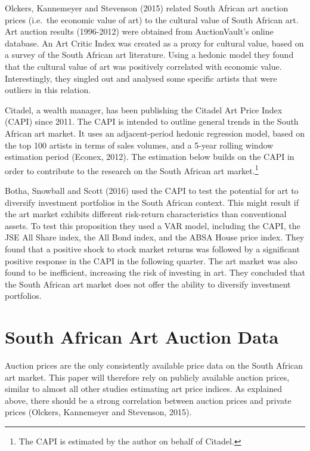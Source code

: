 \documentclass[12pt,]{article}
\let\rmarkdownfootnote\footnote%
\def\footnote{\protect\rmarkdownfootnote}
\begin{document}
Olckers, Kannemeyer and Stevenson (2015) related South African art
auction prices (i.e.~the economic value of art) to the cultural value of
South African art. Art auction results (1996-2012) were obtained from
AuctionVault's online database. An Art Critic Index was created as a
proxy for cultural value, based on a survey of the South African art
literature. Using a hedonic model they found that the cultural value of
art was positively correlated with economic value. Interestingly, they
singled out and analysed some specific artists that were outliers in
this relation.

Citadel, a wealth manager, has been publishing the Citadel Art Price
Index (CAPI) since 2011. The CAPI is intended to outline general trends
in the South African art market. It uses an adjacent-period hedonic
regression model, based on the top 100 artists in terms of sales
volumes, and a 5-year rolling window estimation period (Econex, 2012).
The estimation below builds on the CAPI in order to contribute to the
research on the South African art market.\footnote{The CAPI is estimated
  by the author on behalf of Citadel.}

Botha, Snowball and Scott (2016) used the CAPI to test the potential for
art to diversify investment portfolios in the South African context.
This might result if the art market exhibits different risk-return
characteristics than conventional assets. To test this proposition they
used a VAR model, including the CAPI, the JSE All Share index, the All
Bond index, and the ABSA House price index. They found that a positive
shock to stock market returns was followed by a significant positive
response in the CAPI in the following quarter. The art market was also
found to be inefficient, increasing the risk of investing in art. They
concluded that the South African art market does not offer the ability
to diversify investment portfolios.

\section{South African Art Auction
Data}\label{south-african-art-auction-data}

Auction prices are the only consistently available price data on the
South African art market. This paper will therefore rely on publicly
available auction prices, similar to almost all other studies estimating
art price indices. As explained above, there should be a strong
correlation between auction prices and private prices (Olckers,
Kannemeyer and Stevenson, 2015).
\end{document}
